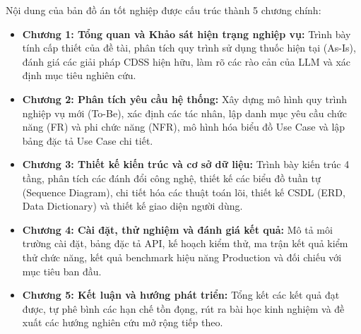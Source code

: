 Nội dung của bản đồ án tốt nghiệp được cấu trúc thành 5 chương chính:
\begin{itemize}[leftmargin=1.5em]
    \item \textbf{Chương 1: Tổng quan và Khảo sát hiện trạng nghiệp vụ:} Trình bày tính cấp thiết của đề tài, phân tích quy trình sử dụng thuốc hiện tại (As-Is), đánh giá các giải pháp CDSS hiện hữu, làm rõ các rào cản của LLM và xác định mục tiêu nghiên cứu.
    \item \textbf{Chương 2: Phân tích yêu cầu hệ thống:} Xây dựng mô hình quy trình nghiệp vụ mới (To-Be), xác định các tác nhân, lập danh mục yêu cầu chức năng (FR) và phi chức năng (NFR), mô hình hóa biểu đồ Use Case và lập bảng đặc tả Use Case chi tiết.
    \item \textbf{Chương 3: Thiết kế kiến trúc và cơ sở dữ liệu:} Trình bày kiến trúc 4 tầng, phân tích các đánh đổi công nghệ, thiết kế các biểu đồ tuần tự (Sequence Diagram), chi tiết hóa các thuật toán lõi, thiết kế CSDL (ERD, Data Dictionary) và thiết kế giao diện người dùng.
    \item \textbf{Chương 4: Cài đặt, thử nghiệm và đánh giá kết quả:} Mô tả môi trường cài đặt, bảng đặc tả API, kế hoạch kiểm thử, ma trận kết quả kiểm thử chức năng, kết quả benchmark hiệu năng Production và đối chiếu với mục tiêu ban đầu.
    \item \textbf{Chương 5: Kết luận và hướng phát triển:} Tổng kết các kết quả đạt được, tự phê bình các hạn chế tồn đọng, rút ra bài học kinh nghiệm và đề xuất các hướng nghiên cứu mở rộng tiếp theo.
\end{itemize}

